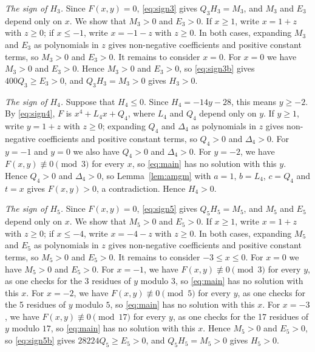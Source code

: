 \documentclass[11pt]{article}
\begin{document}
\emph{The sign of $H_{3}$.} Since $F(x,y)=0$, \eqref{eq:sign3} gives $Q_{3}H_{3}=M_{3}$, and $M_{3}$ and $E_{3}$ depend only on $x$. We show that $M_{3}>0$ and $E_{3}>0$. If $x\geq1$, write $x=1+z$ with $z\geq0$; if $x\leq-1$, write $x=-1-z$ with $z\geq0$. In both cases, expanding $M_{3}$ and $E_{3}$ as polynomials in $z$ gives non-negative coefficients and positive constant terms, so $M_{3}>0$ and $E_{3}>0$. It remains to consider $x=0$. For $x=0$ we have $M_{3}>0$ and $E_{3}>0$. Hence $M_{3}>0$ and $E_{3}>0$, so \eqref{eq:sign3b} gives $400Q_{3}\geq E_{3}>0$, and $Q_{3}H_{3}=M_{3}>0$ gives $H_{3}>0$.

\emph{The sign of $H_{4}$.} Suppose that $H_{4}\leq0$. Since $H_{4}=-14y-28$, this means $y\geq-2$. By \eqref{eq:sign4}, $F$ is $x^4+L_{4}x+Q_{4}$, where $L_{4}$ and $Q_{4}$ depend only on $y$. If $y\geq1$, write $y=1+z$ with $z\geq0$; expanding $Q_{4}$ and $\Delta_{4}$ as polynomials in $z$ gives non-negative coefficients and positive constant terms, so $Q_{4}>0$ and $\Delta_{4}>0$. For $y=-1$ and $y=0$ we also have $Q_{4}>0$ and $\Delta_{4}>0$. For $y=-2$, we have $F(x,y)\not\equiv0\pmod{3}$ for every $x$, so \eqref{eq:main} has no solution with this $y$. Hence $Q_{4}>0$ and $\Delta_{4}>0$, so Lemma~\ref{lem:amgm} with $a=1$, $b=L_{4}$, $c=Q_{4}$ and $t=x$ gives $F(x,y)>0$, a contradiction. Hence $H_{4}>0$.

\emph{The sign of $H_{5}$.} Since $F(x,y)=0$, \eqref{eq:sign5} gives $Q_{5}H_{5}=M_{5}$, and $M_{5}$ and $E_{5}$ depend only on $x$. We show that $M_{5}>0$ and $E_{5}>0$. If $x\geq1$, write $x=1+z$ with $z\geq0$; if $x\leq-4$, write $x=-4-z$ with $z\geq0$. In both cases, expanding $M_{5}$ and $E_{5}$ as polynomials in $z$ gives non-negative coefficients and positive constant terms, so $M_{5}>0$ and $E_{5}>0$. It remains to consider $-3\leq x\leq0$. For $x=0$ we have $M_{5}>0$ and $E_{5}>0$. For $x=-1$, we have $F(x,y)\not\equiv0\pmod{3}$ for every $y$, as one checks for the 3 residues of $y$ modulo $3$, so \eqref{eq:main} has no solution with this $x$. For $x=-2$, we have $F(x,y)\not\equiv0\pmod{5}$ for every $y$, as one checks for the 5 residues of $y$ modulo $5$, so \eqref{eq:main} has no solution with this $x$. For $x=-3$, we have $F(x,y)\not\equiv0\pmod{17}$ for every $y$, as one checks for the 17 residues of $y$ modulo $17$, so \eqref{eq:main} has no solution with this $x$. Hence $M_{5}>0$ and $E_{5}>0$, so \eqref{eq:sign5b} gives $28224Q_{5}\geq E_{5}>0$, and $Q_{5}H_{5}=M_{5}>0$ gives $H_{5}>0$.
\end{document}
